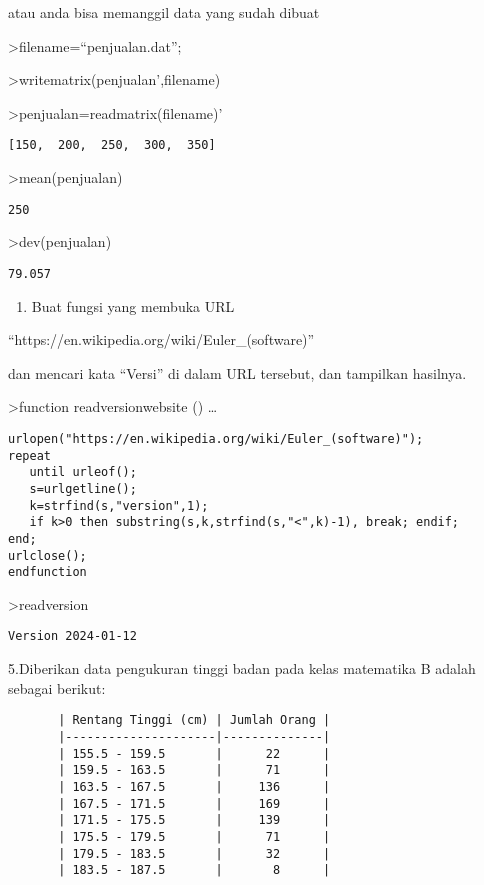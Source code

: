 \documentclass[
]{book}
\providecommand{\tightlist}{%
  \setlength{\itemsep}{0pt}\setlength{\parskip}{0pt}}
\begin{document}
atau anda bisa memanggil data yang sudah dibuat

\textgreater filename=``penjualan.dat'';

\textgreater writematrix(penjualan',filename)

\textgreater penjualan=readmatrix(filename)'

\begin{verbatim}
[150,  200,  250,  300,  350]
\end{verbatim}

\textgreater mean(penjualan)

\begin{verbatim}
250
\end{verbatim}

\textgreater dev(penjualan)

\begin{verbatim}
79.057
\end{verbatim}

\begin{enumerate}
\def\labelenumi{\arabic{enumi}.}
\setcounter{enumi}{3}
\tightlist
\item
  Buat fungsi yang membuka URL
\end{enumerate}

``https://en.wikipedia.org/wiki/Euler\_(software)''

dan mencari kata ``Versi'' di dalam URL tersebut, dan tampilkan hasilnya.

\textgreater function readversionwebsite () \ldots{}

\begin{verbatim}
urlopen("https://en.wikipedia.org/wiki/Euler_(software)");
repeat
   until urleof();
   s=urlgetline();
   k=strfind(s,"version",1);
   if k>0 then substring(s,k,strfind(s,"<",k)-1), break; endif;
end;
urlclose();
endfunction
\end{verbatim}

\textgreater readversion

\begin{verbatim}
Version 2024-01-12
\end{verbatim}

5.Diberikan data pengukuran tinggi badan pada kelas matematika B adalah sebagai berikut:

\begin{verbatim}
       | Rentang Tinggi (cm) | Jumlah Orang |  
       |---------------------|--------------|  
       | 155.5 - 159.5       |      22      |  
       | 159.5 - 163.5       |      71      |  
       | 163.5 - 167.5       |     136      |  
       | 167.5 - 171.5       |     169      |  
       | 171.5 - 175.5       |     139      |  
       | 175.5 - 179.5       |      71      |  
       | 179.5 - 183.5       |      32      |  
       | 183.5 - 187.5       |       8      |  
\end{verbatim}
\end{document}
